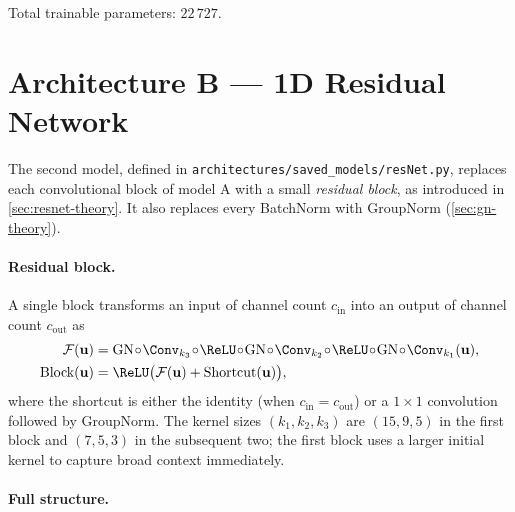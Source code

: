 Total trainable parameters: $22\,727$.

\section{Architecture B --- 1D Residual Network}
\label{sec:archi-resnet}

The second model, defined in
\texttt{architectures/saved\_models/resNet.py}, replaces each
convolutional block of model A with a small \emph{residual block}, as
introduced in \cref{sec:resnet-theory}. It also replaces every
BatchNorm with GroupNorm (\cref{sec:gn-theory}).

\paragraph{Residual block.} A single block transforms an input of
channel count $c_{\text{in}}$ into an output of channel count
$c_{\text{out}}$ as
\begin{align*}
    \mathcal{F}(\mathbf{u}) &= \mathrm{GN} \!\circ\! \Conv_{k_3} \!\circ\! \ReLU \!\circ\! \mathrm{GN} \!\circ\! \Conv_{k_2} \!\circ\! \ReLU \!\circ\! \mathrm{GN} \!\circ\! \Conv_{k_1} (\mathbf{u}), \\
    \text{Block}(\mathbf{u}) &= \ReLU\bigl( \mathcal{F}(\mathbf{u}) + \mathrm{Shortcut}(\mathbf{u}) \bigr),
\end{align*}
where the shortcut is either the identity (when
$c_{\text{in}} = c_{\text{out}}$) or a $1{\times}1$ convolution
followed by GroupNorm. The kernel sizes
$(k_1, k_2, k_3)$ are $(15, 9, 5)$ in the first block and $(7, 5, 3)$
in the subsequent two; the first block uses a larger initial kernel to
capture broad context immediately.

\paragraph{Full structure.}


